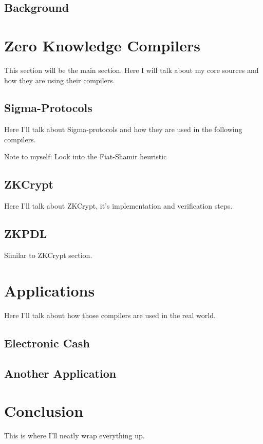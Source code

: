 \documentclass{sig-alternate}
\begin{document}
	\subsection{Background}
	

\section{Zero Knowledge Compilers}
	This section will be the main section. Here I will talk about my core sources and
	how they are using their compilers.

	\subsection{Sigma-Protocols}
		Here I'll talk about Sigma-protocols and how they are used in the following
		compilers.
		
		Note to myself: Look into the Fiat-Shamir heuristic
	\subsection{ZKCrypt}
		Here I'll talk about ZKCrypt, it's implementation and verification steps.
		
	\subsection{ZKPDL}
		Similar to ZKCrypt section.

\section{Applications}
	Here I'll talk about how those compilers are used in the real world.
	
	\subsection{Electronic Cash}
	
	\subsection{Another Application}

\section{Conclusion}
	This is where I'll neatly wrap everything up.




\end{document}
